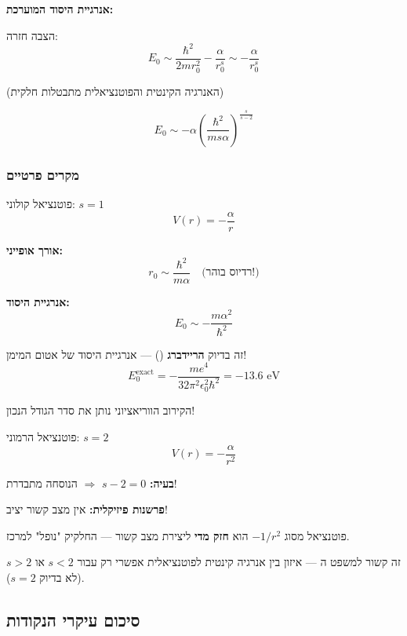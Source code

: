\textbf{אנרגיית היסוד המוערכת:}

הצבה חזרה:
\[
E_0 \sim \frac{\hbar^2}{2m r_0^2} - \frac{\alpha}{r_0^s} \sim -\frac{\alpha}{r_0^s}
\]

(האנרגיה הקינטית והפוטנציאלית מתבטלות חלקית)

\[
\boxed{E_0 \sim -\alpha \left(\frac{\hbar^2}{m s \alpha}\right)^{\frac{s}{s-2}}}
\]

\subsubsection*{מקרים פרטיים}

\begin{examplebox}{פוטנציאל קולוני: $s = 1$}
\[
V(r) = -\frac{\alpha}{r}
\]

\textbf{אורך אופייני:}
\[
r_0 \sim \frac{\hbar^2}{m\alpha} \quad \text{(רדיוס בוהר!)}
\]

\textbf{אנרגיית היסוד:}
\[
E_0 \sim -\frac{m\alpha^2}{\hbar^2}
\]

זה בדיוק \textbf{הריידברג} () — אנרגיית היסוד של אטום המימן!
\[
E_0^{\text{exact}} = -\frac{me^4}{32\pi^2\epsilon_0^2\hbar^2} = -13.6\text{ eV}
\]

הקירוב הווריאציוני נותן את סדר הגודל הנכון!
\end{examplebox}

\begin{examplebox}{פוטנציאל הרמוני: $s = 2$}
\[
V(r) = -\frac{\alpha}{r^2}
\]

\textbf{בעיה:} $s - 2 = 0$ $\Rightarrow$ הנוסחה מתבדרת!

\textbf{פרשנות פיזיקלית:} אין מצב קשור יציב!

פוטנציאל מסוג $-1/r^2$ הוא \textbf{חזק מדי} ליצירת מצב קשור — החלקיק "נופל" למרכז.

זה קשור למשפט ה\textbf{} — איזון בין אנרגיה קינטית לפוטנציאלית אפשרי רק עבור $s < 2$ או $s > 2$ (לא בדיוק $s = 2$).
\end{examplebox}

\subsection{סיכום עיקרי הנקודות}


